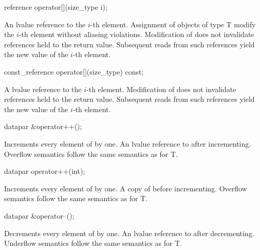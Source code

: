 \begin{wgText}
  \begin{itemdecl}
reference operator[](size_type i);
  \end{itemdecl}
  \begin{itemdescr}
    \pnum\returns An lvalue reference to the $i$-th element.
    \pnum\postconditions Assignment of objects of type \type T modify the $i$-th element without aliasing violations.
    \pnum                Modification of  does not invalidate references held to the return value.
    Subsequent reads from such references yield the new value of the $i$-th element.
  \end{itemdescr}

  \begin{itemdecl}
const_reference operator[](size_type) const;
  \end{itemdecl}
  \begin{itemdescr}
    \pnum\returns A \const lvalue reference to the $i$-th element.
    \pnum\postconditions Modification of  does not invalidate references held to the return value.
    Subsequent reads from such references yield the new value of the $i$-th element.
  \end{itemdescr}

  \begin{itemdecl}
datapar &operator++();
  \end{itemdecl}
  \begin{itemdescr}
    \pnum\effects Increments every element of  by one.
    \pnum\returns An lvalue reference to  after incrementing.
    \pnum\remarks Overflow semantics follow the same semantics as for \type T.
  \end{itemdescr}

  \begin{itemdecl}
datapar operator++(int);
  \end{itemdecl}
  \begin{itemdescr}
    \pnum\effects Increments every element of  by one.
    \pnum\returns A copy of  before incrementing.
    \pnum\remarks Overflow semantics follow the same semantics as for \type T.
  \end{itemdescr}

  \begin{itemdecl}
datapar &operator--();
  \end{itemdecl}
  \begin{itemdescr}
    \pnum\effects Decrements every element of  by one.
    \pnum\returns An lvalue reference to  after decrementing.
    \pnum\remarks Underflow semantics follow the same semantics as for \type T.
  \end{itemdescr}


\end{wgText}
